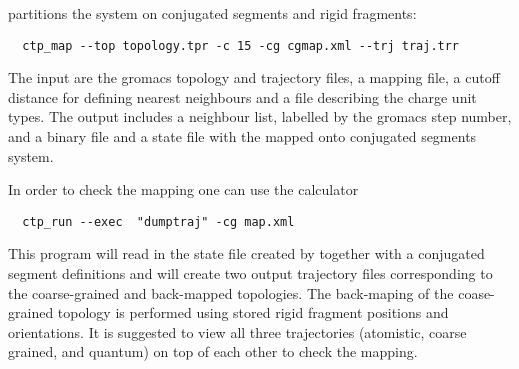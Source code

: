\ctpmap partitions the system on conjugated segments and rigid fragments:
\begin{verbatim}
  ctp_map --top topology.tpr -c 15 -cg cgmap.xml --trj traj.trr
\end{verbatim}
The input are the gromacs topology and trajectory files, a mapping file, a cutoff distance for defining nearest neighbours and a file describing the charge unit types. The output includes a neighbour list, labelled by the gromacs step number, and a binary 
file and a state file with the mapped onto conjugated segments system. 

In order to check the mapping one can use the \dumptraj calculator
\begin{verbatim}
  ctp_run --exec  "dumptraj" -cg map.xml 
\end{verbatim}

This program will read in the state file created by \ctpmap together with a conjugated segment definitions and will create two output trajectory files corresponding to the coarse-grained and back-mapped topologies. The back-maping of the coase-grained topology is performed using stored rigid fragment positions and orientations. It is suggested to view all three trajectories (atomistic, coarse grained, and quantum) on top of each other to check the mapping.
